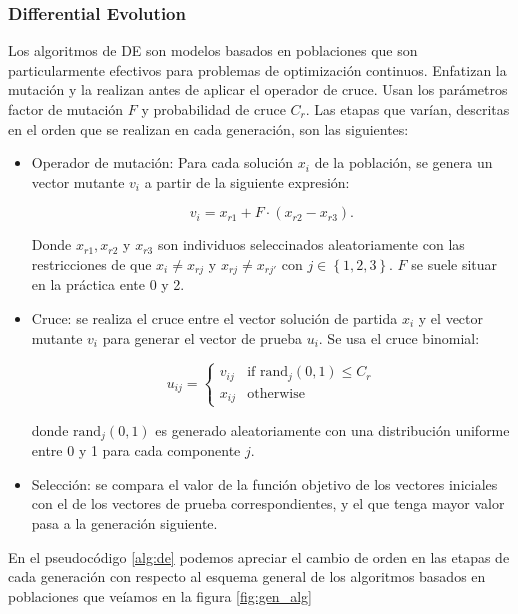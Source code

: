 \subsubsection{Differential Evolution}


Los algoritmos de DE \cite{diffev} son modelos basados en poblaciones que son particularmente efectivos para problemas de optimización continuos. Enfatizan la mutación y la realizan antes de aplicar el operador de cruce. Usan los parámetros factor de mutación $F$ y probabilidad de cruce $C_r$. Las etapas que varían, descritas en el orden que se realizan en cada generación, son las siguientes:

\begin{itemize}
	\item{Operador de mutación: Para cada solución $x_i$ de la población, se genera un vector mutante $v_i$ a partir de la siguiente expresión:
	
	$$v_i = x_{r1} + F \cdot (x_{r2} - x_{r3}).$$
	
	Donde $x_{r1}, x_{r2}$ y $x_{r3}$ son individuos seleccinados aleatoriamente con las restricciones de que $x_i  \neq x_{rj}$ y $x_{rj} \neq x_{rj'}$ con $j \in \left \{ 1,2,3 \right \}$. $F$ se suele situar en la práctica ente 0 y 2.		
	}
	
	\item{Cruce: se realiza el cruce entre el vector solución de partida $x_i$ y el vector mutante $v_i$ para generar el vector de prueba $u_i$. Se usa el cruce binomial:
	
	$$u_{ij} = \begin{cases}
		v_{ij} & \text{if } \text{rand}_j(0,1) \leq C_r \\
		x_{ij} & \text{otherwise}
		\end{cases} $$
		
		donde $\text{rand}_j(0,1)$ es generado aleatoriamente con una distribución uniforme entre 0 y 1 para cada componente $j$.	
	}
	
	\item{Selección: se compara el valor de la función objetivo de los vectores iniciales con el de los vectores de prueba correspondientes, y el que tenga mayor valor pasa a la generación siguiente.}

\end{itemize}

En el pseudocódigo \ref{alg:de} podemos apreciar el cambio de orden en las etapas de cada generación con respecto al esquema general de los algoritmos basados en poblaciones que veíamos en la figura \ref{fig:gen_alg}

